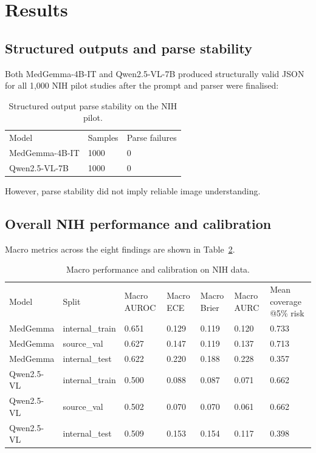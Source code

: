 \section{Results}

\subsection{Structured outputs and parse stability}

Both MedGemma-4B-IT and Qwen2.5-VL-7B produced structurally valid JSON for all 1,000 NIH pilot studies after the prompt and parser were finalised:

\begin{table}[t]
\centering
\small
\begin{tabular}{lll}
\hline
Model & Samples & Parse failures \\
MedGemma-4B-IT & 1000 & 0 \\
Qwen2.5-VL-7B & 1000 & 0 \\
\hline
\end{tabular}
\caption{Structured output parse stability on the NIH pilot.}
\label{tab:parse}
\end{table}


However, parse stability did not imply reliable image understanding.

\subsection{Overall NIH performance and calibration}

Macro metrics across the eight findings are shown in Table~\ref{tab:main}.

\begin{table}[t]
\centering
\small
\begin{tabular}{lllllll}
\hline
Model & Split & Macro AUROC & Macro ECE & Macro Brier & Macro AURC & Mean coverage @5\% risk \\
MedGemma & internal\_train & 0.651 & 0.129 & 0.119 & 0.120 & 0.733 \\
MedGemma & source\_val & 0.627 & 0.147 & 0.119 & 0.137 & 0.713 \\
MedGemma & internal\_test & 0.622 & 0.220 & 0.188 & 0.228 & 0.357 \\
Qwen2.5-VL & internal\_train & 0.500 & 0.088 & 0.087 & 0.071 & 0.662 \\
Qwen2.5-VL & source\_val & 0.502 & 0.070 & 0.070 & 0.061 & 0.662 \\
Qwen2.5-VL & internal\_test & 0.509 & 0.153 & 0.154 & 0.117 & 0.398 \\
\hline
\end{tabular}
\caption{Macro performance and calibration on NIH data.}
\label{tab:main}
\end{table}


